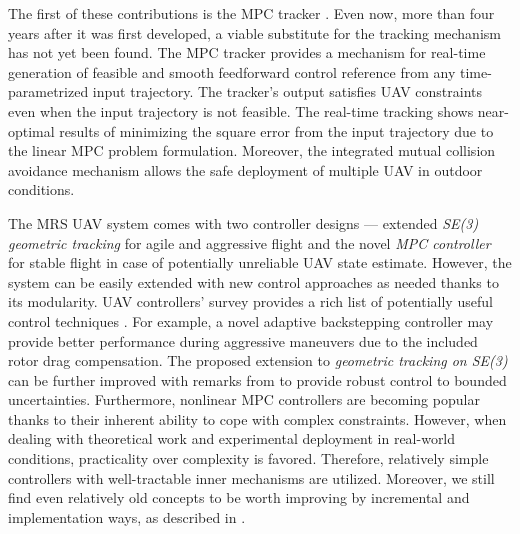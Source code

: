 \documentclass[a4paper,11pt,twoside,openright]{book}
\begin{document}
The first of these contributions is the \acl{MPC} tracker \cite{baca2018model}.
Even now, more than four years after it was first developed, a viable substitute for the tracking mechanism has not yet been found.
The \ac{MPC} tracker provides a mechanism for real-time generation of feasible and smooth feedforward control reference from any time-parametrized input trajectory.
The tracker's output satisfies \ac{UAV} constraints even when the input trajectory is not feasible.
The real-time tracking shows near-optimal results of minimizing the square error from the input trajectory due to the linear \ac{MPC} problem formulation.
Moreover, the integrated mutual collision avoidance mechanism allows the safe deployment of multiple \acl{UAV} in outdoor conditions.

The MRS \ac{UAV} system \cite{baca2020mrs} comes with two controller designs --- extended \emph{SE(3) geometric tracking} \cite{lee2010geometric} for agile and aggressive flight and the novel \emph{MPC controller} for stable flight in case of potentially unreliable \ac{UAV} state estimate.
However, the system can be easily extended with new control approaches as needed thanks to its modularity.
UAV controllers' survey provides a rich list of potentially useful control techniques \cite{nascimento2019position}.
For example, a novel adaptive backstepping controller \cite{zhang2019robust, labbadi2019robust} may provide better performance during aggressive maneuvers due to the included rotor drag compensation.
The proposed extension to \emph{geometric tracking on SE(3)} \cite{lee2010geometric} can be further improved with remarks from \cite{lee2013nonlinear} to provide robust control to bounded uncertainties.
Furthermore, nonlinear \ac{MPC} controllers are becoming popular \cite{nascimento2019nmpc, pereira2019nonlinear, kamel2017robust} thanks to their inherent ability to cope with complex constraints.
However, when dealing with theoretical work and experimental deployment in real-world conditions, practicality over complexity is favored.
Therefore, relatively simple controllers \cite{baca2020mrs} with well-tractable inner mechanisms are utilized.
Moreover, we still find even relatively old concepts \cite{lee2010geometric} to be worth improving by incremental and implementation ways, as described in \cite{baca2020mrs}.
\end{document}
